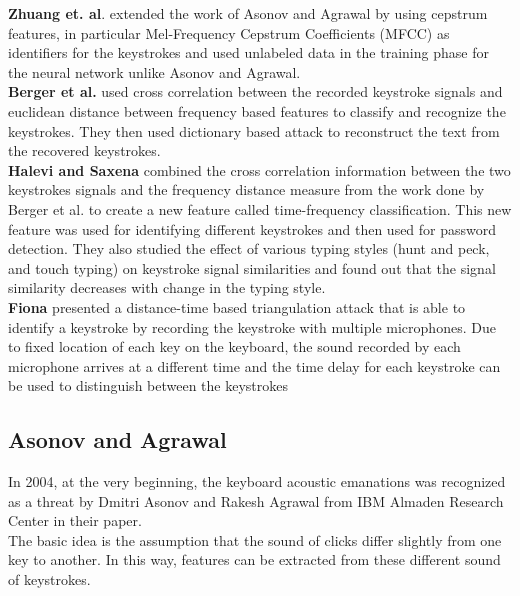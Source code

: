 \documentclass[12pt,a4paper]{article}
\begin{document}
\textbf{Zhuang et. al\cite{DBLP:conf/ccs/ZhuangZT05}}. extended the work of Asonov and Agrawal by using cepstrum features, in particular Mel-Frequency Cepstrum Coefficients (MFCC) as identifiers for the keystrokes and used unlabeled data in the training phase for the neural network unlike Asonov and Agrawal.\\

\textbf{Berger et al.\cite{DBLP:conf/ccs/BergerWY06}}  used cross correlation between the recorded keystroke signals and euclidean distance between frequency based features to classify and recognize the keystrokes. They then used dictionary based attack to reconstruct the text from the recovered keystrokes.\\

\textbf{Halevi and Saxena\cite{DBLP:conf/ccs/HaleviS12}} combined the cross correlation information between the two keystrokes signals and the frequency distance measure from the work done by Berger et al. to create a new feature called time-frequency classification. This new feature was used for identifying different keystrokes and then used for password detection. They also studied the effect of various typing styles (hunt and peck, and touch typing) on keystroke signal similarities and found out that the signal similarity decreases with change in the typing style.\\

\textbf{Fiona\cite{Fiona2006}} presented a distance-time based triangulation attack that is able to identify a keystroke by recording the keystroke with multiple microphones. Due to fixed location of each key on the keyboard, the sound recorded by each microphone arrives at a different time and the time delay for each keystroke can be used to distinguish between the keystrokes\\




\subsection{Asonov and Agrawal}

In 2004, at the very beginning, the keyboard acoustic emanations was recognized as a threat by Dmitri Asonov and Rakesh Agrawal from IBM  Almaden Research Center in their paper. \\

The basic idea is the assumption that the sound of clicks differ slightly from one key to another. In this way,  features can be extracted from these different sound of keystrokes. \\
\end{document}
